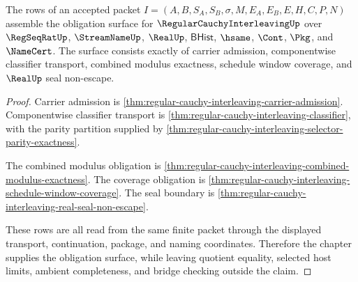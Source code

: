 \begin{theorem}
\label{thm:regular-cauchy-interleaving-obligation-closure-package}
The rows of an accepted packet $I=(A,B,S_A,S_B,\sigma,M,E_A,E_B,E,H,C,P,N)$ assemble the obligation surface for $\RegularCauchyInterleavingUp$ over $\RegSeqRatUp$, $\StreamNameUp$, $\RealUp$, $\mathsf{BHist}$, $\hsame$, $\Cont$, $\Pkg$, and $\NameCert$. The surface consists exactly of carrier admission, componentwise classifier transport, combined modulus exactness, schedule window coverage, and $\RealUp$ seal non-escape.
\end{theorem}
\begin{proof}
Carrier admission is \autoref{thm:regular-cauchy-interleaving-carrier-admission}. Componentwise classifier transport is \autoref{thm:regular-cauchy-interleaving-classifier}, with the parity partition supplied by \autoref{thm:regular-cauchy-interleaving-selector-parity-exactness}.

The combined modulus obligation is \autoref{thm:regular-cauchy-interleaving-combined-modulus-exactness}. The coverage obligation is \autoref{thm:regular-cauchy-interleaving-schedule-window-coverage}. The seal boundary is \autoref{thm:regular-cauchy-interleaving-real-seal-non-escape}.

These rows are all read from the same finite packet through the displayed transport, continuation, package, and naming coordinates. Therefore the chapter supplies the obligation surface, while leaving quotient equality, selected host limits, ambient completeness, and bridge checking outside the claim.
\end{proof}

